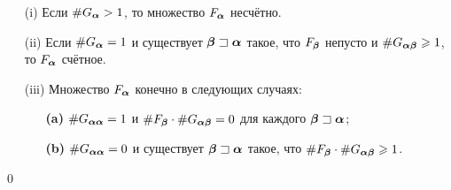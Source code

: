 \begin{corollary}\label{fin_int_sq}
\qquad
\begin{itemize}[nolistsep]
 \item[(i)] Если $\#G_{{\bm{\alpha}}}> 1$, то множество $F_{\bm{\alpha}}$ несчётно.
 \item[(ii)] Если $\#G_{{\bm{\alpha}}}=1$ и существует ${\bm{\beta}}\sqsupset{\bm{\alpha}}$ такое, что  $F_{\bm{\beta}}$ непусто и $\#G_{{\bm{\alpha}}{\bm{\beta}}}\geqslant1$, то $F_{\bm{\alpha}}$ счётное.
 \item[(iii)] Множество $F_{\bm{\alpha}}$ конечно в следующих случаях:
 \begin{itemize}[nolistsep]
 \item[\textbf{(a)}] $\#G_{{\bm{\alpha}}{\bm{\alpha}}}=1$ и $\#F_{\bm{\beta}}\cdot\#G_{{\bm{\alpha}}{\bm{\beta}}}=0$ для каждого ${\bm{\beta}}\sqsupset{\bm{\alpha}}$;
 \item[\textbf{(b)}] $\#G_{{\bm{\alpha}}{\bm{\alpha}}}=0$ и существует ${\bm{\beta}}\sqsupset{\bm{\alpha}}$ такое, что $\#F_{\bm{\beta}}\cdot\#G_{{\bm{\alpha}}{\bm{\beta}}}\geqslant1$.
 \end{itemize}
\end{itemize}\qed 
\end{corollary}

